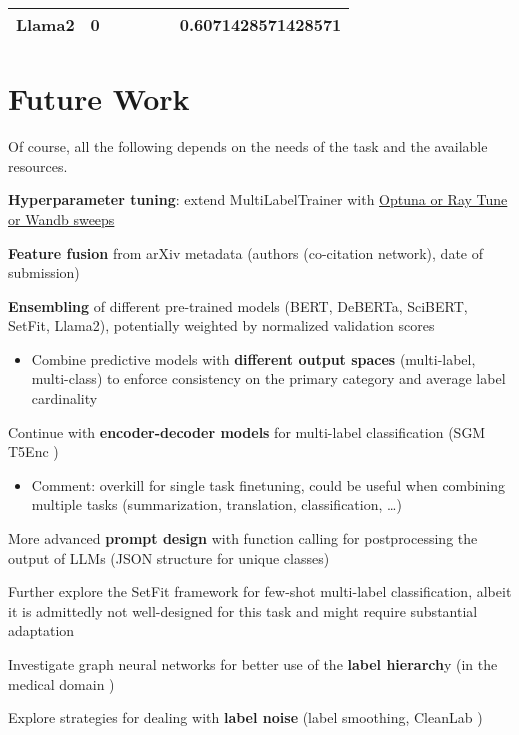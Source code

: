 \documentclass[11pt,letterpaper]{article}
\begin{document}
\begin{table}[h]
\begin{tabular}{l|n{1}{4}n{1}{4}n{1}{4}n{1}{4}n{1}{4}n{1}{4}}
    Llama2                  & 0                              &                                &                                &                                 &                                & 0.6071428571428571 \\
    \bottomrule
  \end{tabular}
\end{table}

\section{Future Work}

Of course, all the following depends on the needs of the task and the available resources.
\small
\begin{todolist}
  \item \textbf{Hyperparameter tuning}: extend MultiLabelTrainer with \href{https://huggingface.co/docs/transformers/en/hpo_train}{Optuna or Ray Tune or Wandb sweeps}
  \item \textbf{Feature fusion} from arXiv metadata (\eg authors (co-citation network), date of submission)
  \item \textbf{Ensembling} of different pre-trained models (\eg BERT, DeBERTa, SciBERT, SetFit, Llama2), potentially weighted by normalized validation scores
  \begin{itemize}
    \item Combine predictive models with \textbf{different output spaces} (\eg multi-label, multi-class) to enforce consistency on the primary category and average label cardinality
  \end{itemize}
  \item Continue with \textbf{encoder-decoder models} for multi-label classification (\eg SGM \cite{syang2018sgm} T5Enc \cite{kementchedjhieva2023exploration})
  \begin{itemize}
    \item Comment: overkill for single task finetuning, could be useful when combining multiple tasks (summarization, translation, classification, \ldots)
  \end{itemize}
  \item More advanced \textbf{prompt design} with function calling for postprocessing the output of LLMs (\eg JSON structure for unique classes)
  \item Further explore the SetFit framework for few-shot multi-label classification, albeit it is admittedly not well-designed for this task and might require substantial adaptation
  \item Investigate graph neural networks for better use of the \textbf{label hierarch}y (\eg in the medical domain \cite{chi2024graph})
  \item Explore strategies for dealing with \textbf{label noise} (\eg label smoothing, CleanLab \cite{kumar2020robust,oyen2022robustness})
\end{todolist}

{\small


}
\end{document}
